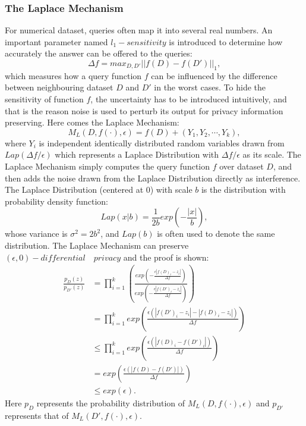 \documentclass[conference]{IEEEtran}
\begin{document}
\subsubsection{The Laplace Mechanism}
For numerical dataset, queries often map it into several real numbers. An important parameter named $l_1-sensitivity$ is introduced to determine how accurately the answer can be offered to the queries:
\begin{equation}
    \Delta f = max_{D, D'}||f(D)-f(D')||_1,
\end{equation}
which measures how a query function $f$ can be influenced by the difference between neighbouring dataset $D$ and $D'$ in the worst cases. To hide the sensitivity of function $f$, the uncertainty has to be introduced intuitively, and that is the reason noise is used to perturb its output for privacy information preserving. Here comes the Laplace Mechanism:
\begin{equation}
    M_L(D, f(\cdot), \epsilon) = f(D) +(Y_1, Y_2, \cdots, Y_k),
\end{equation}
where $Y_i$ is independent identically distributed random variables drawn from $Lap(\Delta f / \epsilon)$ which represents a Laplace Distribution with $\Delta f / \epsilon$ as its scale. The Laplace Mechanism simply computes the query function $f$ over dataset $D$, and then adds the noise drawn from the Laplace Distribution directly as interference. The Laplace Distribution (centered at 0) with scale $b$ is the distribution with probability density function:
\begin{equation}
    Lap(x|b)=\frac{1}{2b}exp(-\frac{|x|}{b}),
\end{equation}
whose variance is ${\sigma}^2 = 2b^2$, and $Lap(b)$ is often used to denote the same distribution. The Laplace Mechanism can preserve $(\epsilon,0)-differential \quad privacy$ and the proof is shown:
\begin{equation}
    \begin{split}
        \frac{p_{D}(z)}{p_{D'}(z)} &= \prod_{i=1}^{k}(\frac{exp(-\frac{\epsilon|f(D)_i-z_i|}{\Delta f})}{exp(-\frac{\epsilon|f(D')_i-z_i|}{\Delta f})})\\
        &= \prod_{i=1}^{k}exp(\frac{\epsilon(|f(D')_i-z_i|-|f(D)_i-z_i|)}{\Delta f})\\
        &\leq \prod_{i=1}^{k}exp(\frac{\epsilon(|f(D)_i-f(D')_i|)}{\Delta f})\\
        &= exp(\frac{\epsilon(|f(D)-f(D')|)}{\Delta f})\\
        &\leq exp(\epsilon).
    \end{split}
\end{equation}
Here $p_{D}$ represents the probability distribution of $M_L(D, f(\cdot), \epsilon)$ and $p_{D'}$ represents that of $M_L(D', f(\cdot), \epsilon)$.
\end{document}
